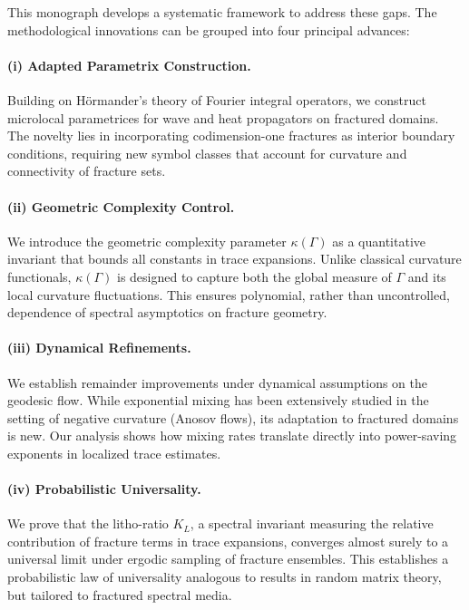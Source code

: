 This monograph develops a systematic framework to address these gaps.
The methodological innovations can be grouped into four principal
advances:

\paragraph{(i) Adapted Parametrix Construction.}
Building on Hörmander’s theory of Fourier integral operators, we
construct microlocal parametrices for wave and heat propagators on
fractured domains. The novelty lies in incorporating codimension-one
fractures as interior boundary conditions, requiring new symbol classes
that account for curvature and connectivity of fracture sets.

\paragraph{(ii) Geometric Complexity Control.}
We introduce the geometric complexity parameter $\kappa(\Gamma)$ as a
quantitative invariant that bounds all constants in trace expansions.
Unlike classical curvature functionals, $\kappa(\Gamma)$ is designed to
capture both the global measure of $\Gamma$ and its local curvature
fluctuations. This ensures polynomial, rather than uncontrolled,
dependence of spectral asymptotics on fracture geometry.

\paragraph{(iii) Dynamical Refinements.}
We establish remainder improvements under dynamical assumptions on the
geodesic flow. While exponential mixing has been extensively studied in
the setting of negative curvature (Anosov flows), its adaptation to
fractured domains is new. Our analysis shows how mixing rates translate
directly into power-saving exponents in localized trace estimates.

\paragraph{(iv) Probabilistic Universality.}
We prove that the litho-ratio $K_L$, a spectral invariant measuring the
relative contribution of fracture terms in trace expansions, converges
almost surely to a universal limit under ergodic sampling of fracture
ensembles. This establishes a probabilistic law of universality
analogous to results in random matrix theory, but tailored to fractured
spectral media.

